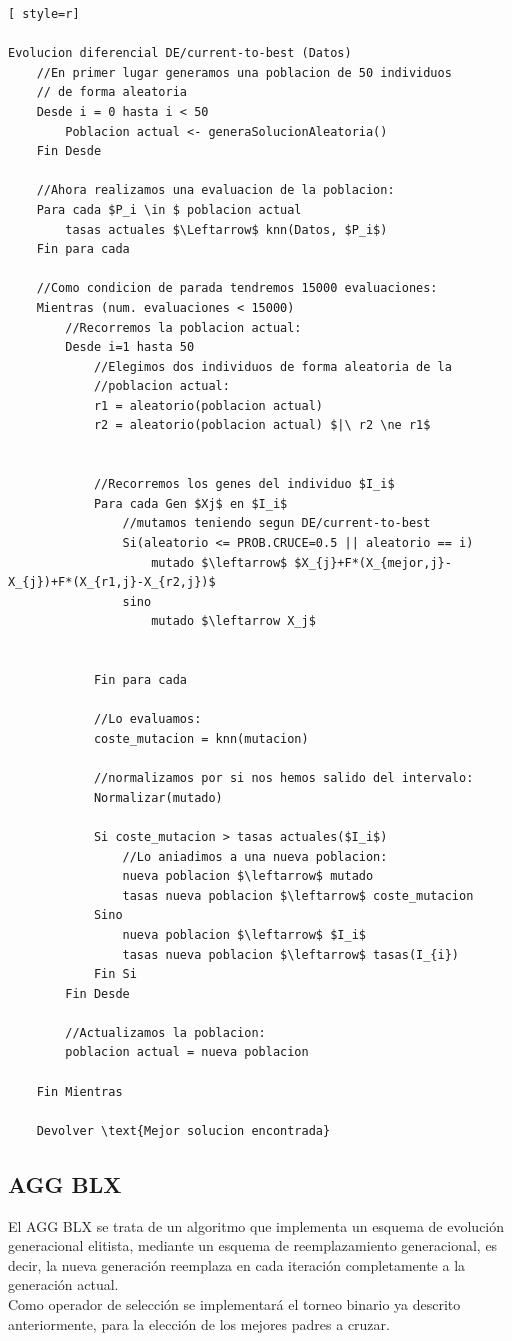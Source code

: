 \begin{lstlisting}[ style=r]

Evolucion diferencial DE/current-to-best (Datos)
	//En primer lugar generamos una poblacion de 50 individuos
	// de forma aleatoria
	Desde i = 0 hasta i < 50
		Poblacion actual <- generaSolucionAleatoria()
	Fin Desde
	
	//Ahora realizamos una evaluacion de la poblacion:
	Para cada $P_i \in $ poblacion actual
		tasas actuales $\Leftarrow$ knn(Datos, $P_i$)
	Fin para cada
	
	//Como condicion de parada tendremos 15000 evaluaciones:
	Mientras (num. evaluaciones < 15000)
		//Recorremos la poblacion actual:
		Desde i=1 hasta 50
			//Elegimos dos individuos de forma aleatoria de la
			//poblacion actual:
			r1 = aleatorio(poblacion actual)
			r2 = aleatorio(poblacion actual) $|\ r2 \ne r1$

			
			//Recorremos los genes del individuo $I_i$
			Para cada Gen $Xj$ en $I_i$
				//mutamos teniendo segun DE/current-to-best
				Si(aleatorio <= PROB.CRUCE=0.5 || aleatorio == i)
					mutado $\leftarrow$ $X_{j}+F*(X_{mejor,j}-X_{j})+F*(X_{r1,j}-X_{r2,j})$
				sino
					mutado $\leftarrow X_j$
				
				
			Fin para cada
			
			//Lo evaluamos:
			coste_mutacion = knn(mutacion)
			
			//normalizamos por si nos hemos salido del intervalo:
			Normalizar(mutado)
			
			Si coste_mutacion > tasas actuales($I_i$)
				//Lo aniadimos a una nueva poblacion:
				nueva poblacion $\leftarrow$ mutado
				tasas nueva poblacion $\leftarrow$ coste_mutacion
			Sino
				nueva poblacion $\leftarrow$ $I_i$
				tasas nueva poblacion $\leftarrow$ tasas(I_{i})
			Fin Si
		Fin Desde
		
		//Actualizamos la poblacion:
		poblacion actual = nueva poblacion
		
	Fin Mientras

	Devolver \text{Mejor solucion encontrada}	
\end{lstlisting}




\subsection{AGG BLX}
El AGG BLX se trata de un algoritmo que implementa un esquema de evolución generacional elitista, mediante un esquema de reemplazamiento generacional, es decir, la nueva generación reemplaza en cada iteración completamente a la generación actual.\\ 
Como operador de selección se implementará el torneo binario ya descrito anteriormente, para la elección de los mejores padres a cruzar.\\ 

